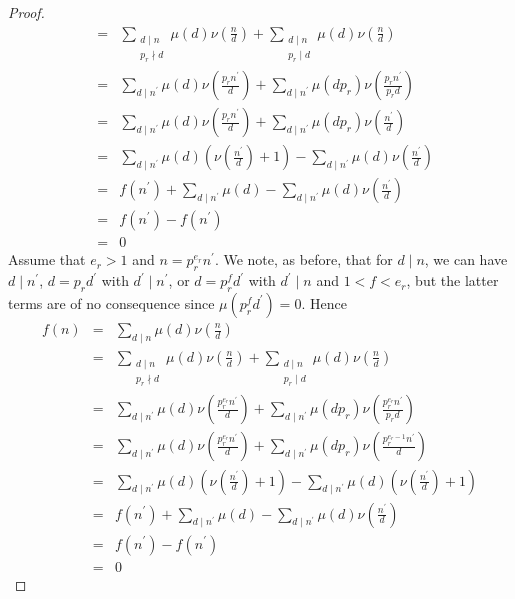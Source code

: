 \documentclass[10pt]{amsart}
\begin{document}
\begin{thm}
\begin{proof}
\begin{eqnarray*}
      &=& \sum_{\substack{d \mid n\\p_r \nmid d}} \mu(d)\nu\left(\frac{n}{d}\right) + \sum_{\substack{d \mid n\\p_r \mid d}} \mu(d)\nu\left(\frac{n}{d}\right)\\
      &=& \sum_{d \mid n^\prime} \mu(d)\nu\left(\frac{p_rn^\prime}{d}\right) + \sum_{d \mid n^\prime} \mu(dp_r)\nu\left(\frac{p_rn^\prime}{p_rd}\right)\\
      &=& \sum_{d \mid n^\prime} \mu(d)\nu\left(\frac{p_rn^\prime}{d}\right) + \sum_{d \mid n^\prime} \mu(dp_r)\nu\left(\frac{n^\prime}{d}\right)\\
      &=& \sum_{d \mid n^\prime} \mu(d)\left(\nu\left(\frac{n^\prime}{d}\right) + 1\right) - \sum_{d \mid n^\prime} \mu(d)\nu\left(\frac{n^\prime}{d}\right)\\
      &=& f(n^\prime) + \sum_{d \mid n^\prime} \mu(d) - \sum_{d \mid n^\prime} \mu(d)\nu\left(\frac{n^\prime}{d}\right)\\
      &=& f(n^\prime) - f(n^\prime)\\
      &=& 0
    \end{eqnarray*}
    Assume that $e_r > 1$ and $n = p_r^{e_r}n^\prime$.
    We note, as before, that for $d \mid n$, we can have $d \mid n^\prime$, $d = p_r d^\prime$ with $d^\prime \mid n^\prime$, or $d = p_r^f d^\prime$ with $d^\prime \mid n$ and $1 < f < e_r$, 
    but the latter terms are of no consequence since $\mu(p_r^f d^\prime) = 0$.
    Hence
    \begin{eqnarray*}
      f(n) &=& \sum_{d \mid n} \mu(d)\nu\left(\frac{n}{d}\right)\\
      &=& \sum_{\substack{d \mid n\\p_r \nmid d}} \mu(d)\nu\left(\frac{n}{d}\right) + \sum_{\substack{d \mid n\\p_r \mid d}} \mu(d)\nu\left(\frac{n}{d}\right)\\
      &=& \sum_{d \mid n^\prime} \mu(d)\nu\left(\frac{p_r^{e_r}n^\prime}{d}\right) + \sum_{d \mid n^\prime} \mu(dp_r)\nu\left(\frac{p_r^{e_r}n^\prime}{p_rd}\right)\\
      &=& \sum_{d \mid n^\prime} \mu(d)\nu\left(\frac{p_r^{e_r}n^\prime}{d}\right) + \sum_{d \mid n^\prime} \mu(dp_r)\nu\left(\frac{p_r^{e_r-1}n^\prime}{d}\right)\\
      &=& \sum_{d \mid n^\prime} \mu(d)\left(\nu\left(\frac{n^\prime}{d}\right) + 1\right) - \sum_{d \mid n^\prime} \mu(d)\left(\nu\left(\frac{n^\prime}{d}\right)+1\right)\\
      &=& f(n^\prime) + \sum_{d \mid n^\prime} \mu(d) - \sum_{d \mid n^\prime} \mu(d)\nu\left(\frac{n^\prime}{d}\right)\\
      &=& f(n^\prime) - f(n^\prime)\\
      &=& 0
    \end{eqnarray*}
  \end{proof}
\end{thm}
\end{document}
